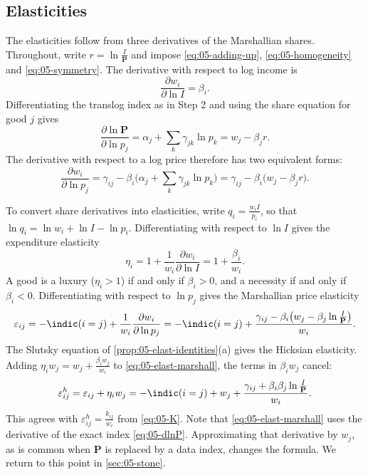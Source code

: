 \subsection{Elasticities}\label{sec:05-aids-elasticities}

The elasticities follow from three derivatives of the Marshallian shares. Throughout, write
$r = \ln\frac{I}{\mathbf{P}}$ and impose \eqref{eq:05-adding-up}, \eqref{eq:05-homogeneity} and
\eqref{eq:05-symmetry}. The derivative with respect to log income is
\begin{equation}\label{eq:05-dw-dI}
\frac{\partial w_i}{\partial\ln I} = \beta_i .
\end{equation}
Differentiating the translog index as in Step 2 and using the share equation for good $j$ gives
\begin{equation}\label{eq:05-dlnP}
\frac{\partial\ln\mathbf{P}}{\partial\ln p_j} = \alpha_j + \sum_k\gamma_{jk}\ln p_k = w_j - \beta_jr .
\end{equation}
The derivative with respect to a log price therefore has two equivalent forms:
\begin{equation}\label{eq:05-dw-dp}
\frac{\partial w_i}{\partial\ln p_j} = \gamma_{ij} - \beta_i\Big(\alpha_j + \sum_k\gamma_{jk}\ln p_k\Big)
= \gamma_{ij} - \beta_i\big(w_j - \beta_jr\big).
\end{equation}

To convert share derivatives into elasticities, write $q_i = \frac{w_iI}{p_i}$, so that
$\ln q_i = \ln w_i + \ln I - \ln p_i$. Differentiating with respect to $\ln I$ gives the expenditure
elasticity
\begin{equation}\label{eq:05-eta}
\eta_i = 1 + \frac{1}{w_i}\frac{\partial w_i}{\partial\ln I} = 1 + \frac{\beta_i}{w_i} .
\end{equation}
A good is a luxury ($\eta_i > 1$) if and only if $\beta_i > 0$, and a necessity if and only if
$\beta_i < 0$. Differentiating with respect to $\ln p_j$ gives the Marshallian price elasticity
\begin{equation}\label{eq:05-elast-marshall}
\varepsilon_{ij} = -\indic(i=j) + \frac{1}{w_i}\frac{\partial w_i}{\partial\ln p_j}
= -\indic(i=j) + \frac{\gamma_{ij} - \beta_i\big(w_j - \beta_j\ln\frac{I}{\mathbf{P}}\big)}{w_i} .
\end{equation}
The Slutsky equation of \cref{prop:05-elast-identities}(a) gives the Hicksian elasticity. Adding
$\eta_iw_j = w_j + \frac{\beta_iw_j}{w_i}$ to \eqref{eq:05-elast-marshall}, the terms in $\beta_iw_j$ cancel:
\begin{equation}\label{eq:05-elast-hicks}
\varepsilon^h_{ij} = \varepsilon_{ij} + \eta_iw_j
= -\indic(i=j) + w_j + \frac{\gamma_{ij} + \beta_i\beta_j\ln\frac{I}{\mathbf{P}}}{w_i} .
\end{equation}
This agrees with $\varepsilon^h_{ij} = \frac{k_{ij}}{w_i}$ from \eqref{eq:05-K}. Note that
\eqref{eq:05-elast-marshall} uses the derivative of the exact index \eqref{eq:05-dlnP}. Approximating that
derivative by $w_j$, as is common when $\mathbf{P}$ is replaced by a data index, changes the formula. We
return to this point in \cref{sec:05-stone}.


